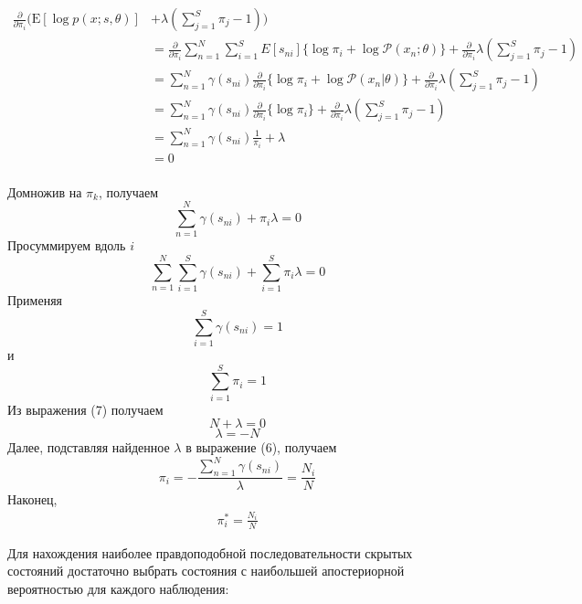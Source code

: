 \documentclass{matmex-diploma}
\begin{document}
\begin{align*}
\frac{\partial}{\partial \pi_i}( \mathrm{E}[\log p(x;s,\theta)] &+ \lambda(\sum_{j=1}^S \pi_j - 1))
\\&= \frac{\partial}{\partial \pi_i}\sum_{n=1}^N \sum_{i=1}^S
E[s_{ni}]\{\log \pi_i + \log \mathcal{P}(x_n;\theta)\} + \frac{\partial}{\partial \pi_i}\lambda(\sum_{j=1}^S \pi_j - 1)
\\& = \sum_{n=1}^N
\gamma(s_{ni})\frac{\partial}{\partial \pi_i}\{\log \pi_i + \log \mathcal{P}(x_n|\theta)\} + \frac{\partial}{\partial \pi_i} \lambda(\sum_{j=1}^S \pi_j - 1)\\
&=\sum_{n=1}^N
\gamma(s_{ni})\frac{\partial}{\partial \pi_i}\{\log \pi_i\} + \frac{\partial}{\partial \pi_i} \lambda(\sum_{j=1}^S \pi_j - 1) \\
&=\sum_{n=1}^N
\gamma(s_{ni})\frac{1}{\pi_i} + \lambda \\&= 0
\end{align*}
\\
Домножив на $\pi_k$, получаем
\begin{equation}
\sum_{n=1}^N \gamma(s_{ni}) + \pi_i \lambda = 0
\end{equation}
Просуммируем вдоль $i$
\begin{equation}
\sum_{n=1}^N \sum_{i=1}^S \gamma(s_{ni}) + \sum_{i=1}^S \pi_i \lambda = 0
\end{equation}
Применяя
$$\sum_{i=1}^S \gamma(s_{ni}) = 1$$
и
$$\sum_{i=1}^S \pi_i = 1$$
Из выражения (7) получаем
$$N + \lambda = 0$$
$$\lambda = -N$$
Далее, подставляя найденное $\lambda$ в выражение (6), получаем
$$\pi_i = - \frac{\sum_{n=1}^N\gamma(s_{ni})}{\lambda} = \frac{N_i}{N}$$
Наконец,
\begin{align*}
\pi_{i}^* = \frac{N_i}{N} 
\end{align*}

Для нахождения наиболее правдоподобной последовательности скрытых состояний достаточно выбрать состояния с наибольшей апостериорной вероятностью для каждого наблюдения:
\end{document}

